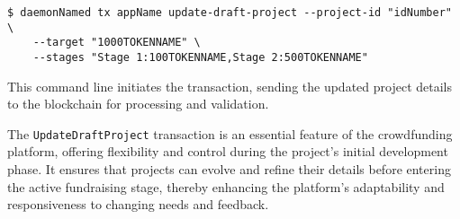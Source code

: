 \begin{verbatim}
$ daemonNamed tx appName update-draft-project --project-id "idNumber" \
    --target "1000TOKENNAME" \
    --stages "Stage 1:100TOKENNAME,Stage 2:500TOKENNAME"
\end{verbatim}

This command line initiates the transaction, sending the updated project details to the blockchain for processing and validation.

The \texttt{UpdateDraftProject} transaction is an essential feature of the crowdfunding platform, offering flexibility and control during the project's initial development phase. It ensures that projects can evolve and refine their details before entering the active fundraising stage, thereby enhancing the platform's adaptability and responsiveness to changing needs and feedback.


